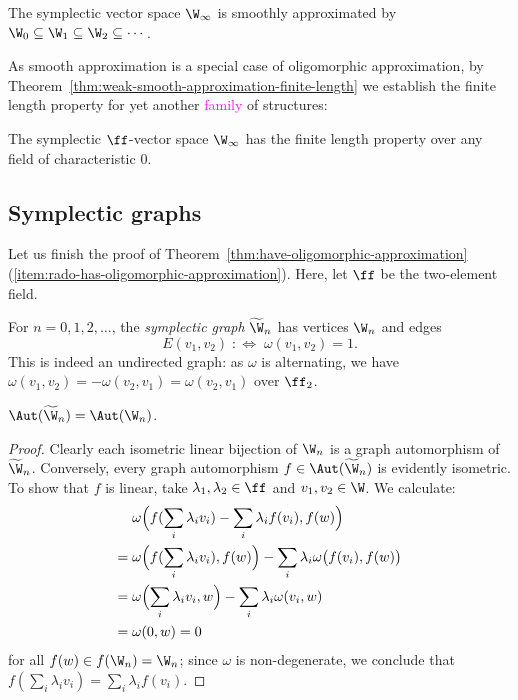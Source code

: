 \begin{theorem}\label{thm:symplectic-smooth-approximation}
    The symplectic vector space $\W_\infty$ is smoothly approximated by 
    $\W_0 \subseteq \W_1 \subseteq \W_2 \subseteq \cdots$.
\end{theorem}

As smooth approximation is a special case of oligomorphic approximation, 
by Theorem~\ref{thm:weak-smooth-approximation-finite-length} we establish the finite length property for yet another \textcolor{magenta}{family} of structures:
\begin{corollary}
    The symplectic $\ff$-vector space $\W_\infty$ has the finite length property over any field of characteristic $0$.
\end{corollary}




\subsection{Symplectic graphs}
Let us finish the proof of Theorem~\ref{thm:have-oligomorphic-approximation}(\ref{item:rado-has-oligomorphic-approximation}).
Here, let $\ff$ be the two-element field.
\begin{definition}
    For $n = 0, 1, 2, \ldots$, the \emph{symplectic graph} $\widetilde \W_n$ has vertices $\W_n$ and edges
    \[
        E(v_1, v_2) \;:\Longleftrightarrow\; \omega(v_1, v_2) = 1.
    \]
    This is indeed an undirected graph: as $\omega$ is alternating, we have $\omega(v_1, v_2) = -\omega(v_2, v_1) = \omega(v_2, v_1)$ over $\ff_2$.
\end{definition}

\begin{proposition}\label{prop:symplectic-vs-graph}
    $\Aut(\widetilde \W_n) = \Aut(\W_n)$.
\end{proposition}
\begin{proof}
    Clearly each isometric linear bijection of $\W_n$ is a graph automorphism of $\widetilde \W_n$.
    Conversely, every graph automorphism $f \in \Aut(\widetilde \W_n)$ is evidently isometric.
    To show that $f$ is linear, take $\lambda_1, \lambda_2 \in \ff$ and $v_1, v_2 \in \W$.
    We calculate:
    \begin{align*}
        &\omega\Bigl( f(\sum_i \lambda_i v_i) - \sum_i \lambda_i f(v_i) , f(w) \Bigr) \\
        ={}& \omega\Bigl( f(\sum_i \lambda_i v_i), f(w)\Bigr) - \sum_i \lambda_i \omega\bigl(f(v_i), f(w) \bigr) \\
        ={}& \omega\Bigl( \sum_i \lambda_i v_i, w \Bigr) - \sum_i \lambda_i \omega( v_i, w ) \\
        ={}& \omega(0, w) = 0
    \end{align*}
    for all $f(w) \in f(\W_n) = \W_n$;
    since $\omega$ is non-degenerate, 
    we conclude that $f(\sum_i \lambda_i v_i) = \sum_i \lambda_i f(v_i)$.
\end{proof}

